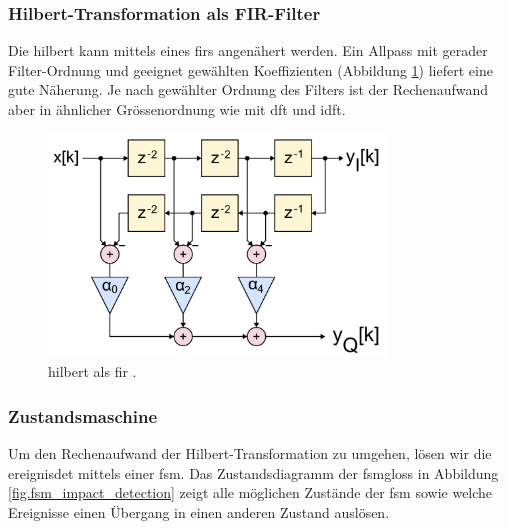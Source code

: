 \subsubsection{Hilbert-Transformation als FIR-Filter}
Die \gls{hilbert} kann mittels eines \gls{fir}s angenähert werden. Ein Allpass mit gerader Filter-Ordnung und geeignet gewählten Koeffizienten (Abbildung \ref{fig.hilbertFIR}) liefert eine gute Näherung. Je nach gewählter Ordnung des Filters ist der Rechenaufwand aber in ähnlicher Grössenordnung wie mit \gls{dft} und \gls{idft}.
\begin{figure}
	\centering
		\includegraphics[width=0.8\textwidth]{images/FIR_Hilbert_Transform_Filter.png}
	\caption{\gls{hilbert} als \gls{fir} \cite{wiki_hilbertFIR}.}
	\label{fig.hilbertFIR}
\end{figure}

\subsubsection{Zustandsmaschine}
Um den Rechenaufwand der Hilbert-Transformation zu umgehen, lösen wir die \gls{ereignisdet} mittels einer \gls{fsm}. Das Zustandsdiagramm der \gls{fsmgloss} in Abbildung \ref{fig.fsm_impact_detection} zeigt alle möglichen Zustände der \gls{fsm} sowie welche Ereignisse einen Übergang in einen anderen Zustand auslösen.

